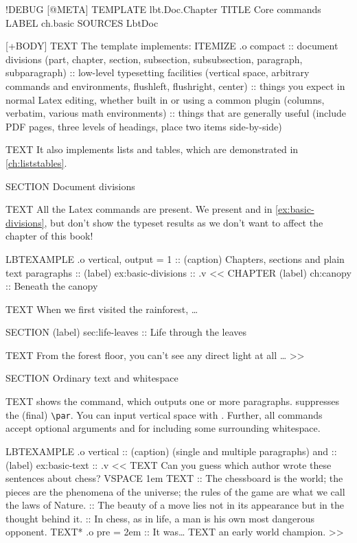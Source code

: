 \begin{lbt}
  !DEBUG
  [@META]
    TEMPLATE lbt.Doc.Chapter
    TITLE Core commands
    LABEL ch.basic
    SOURCES LbtDoc

  [+BODY]
    TEXT The  template implements:
    ITEMIZE .o compact
    :: document divisions (part, chapter, section, subsection, subsubsection, paragraph, subparagraph)
    :: low-level typesetting facilities (vertical space, arbitrary commands and environments, flushleft, flushright, center)
    :: things you expect in normal Latex editing, whether built in or using a common plugin (columns, verbatim, various math environments)
    :: things that are generally useful (include PDF pages, three levels of headings, place two items side-by-side)

    TEXT It also implements lists and tables, which are demonstrated in \cref{ch:liststables}.

    SECTION Document divisions

    TEXT All the Latex commands are present. We present  and  in \cref{ex:basic-divisions}, but don't show the typeset results as we don't want to affect the chapter of this book!

    LBTEXAMPLE .o vertical, output = 1
    :: (caption) Chapters, sections and plain text paragraphs
    :: (label) ex:basic-divisions
    :: .v <<
      CHAPTER (label) ch:canopy :: Beneath the canopy

      TEXT When we first visited the rainforest, \dots

      SECTION (label) sec:life-leaves :: Life through the leaves

      TEXT From the forest floor, you can't see any direct light at all \dots
    >>

    SECTION Ordinary text and whitespace

    TEXT  shows the  command, which outputs one or more paragraphs.  suppresses the (final) \verb|\par|. You can input vertical space with . Further, all commands accept optional arguments  and  for including some surrounding whitespace.

    LBTEXAMPLE .o vertical
    :: (caption)  (single and multiple paragraphs) and 
    :: (label) ex:basic-text
    :: .v <<
      TEXT Can you guess which author wrote these sentences about chess?
      VSPACE 1em
      TEXT
      :: The chessboard is the world; the pieces are the phenomena of the universe; the rules of the game are what we call the laws of Nature.
      :: The beauty of a move lies not in its appearance but in the thought behind it.
      :: In chess, as in life, a man is his own most dangerous opponent.
      TEXT* .o pre = 2em :: It was\dots
      TEXT an early world champion.
    >>


\end{lbt}
